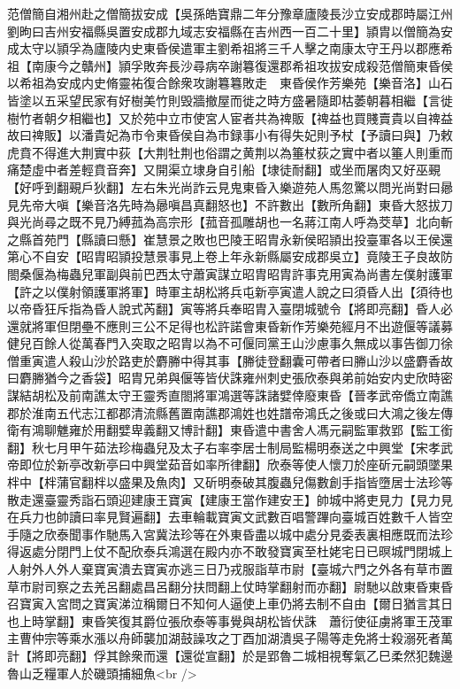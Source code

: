 范僧簡自湘州赴之僧簡拔安成【吳孫皓寶鼎二年分豫章廬陵長沙立安成郡時屬江州劉昫曰吉州安福縣吳置安成郡九域志安福縣在吉州西一百二十里】頴胄以僧簡為安成太守以頴孚為廬陵内史東昏侯遣軍主劉希祖將三千人擊之南康太守王丹以郡應希祖【南康今之贛州】頴孚敗奔長沙尋病卒謝篹復還郡希祖攻拔安成殺范僧簡東昏侯以希祖為安成内史脩靈祐復合餘衆攻謝篹篹敗走　東昏侯作芳樂苑【樂音洛】山石皆塗以五采望民家有好樹美竹則毁牆撤屋而徙之時方盛暑隨即枯萎朝暮相繼【言徙樹竹者朝夕相繼也】又於苑中立市使宮人宦者共為禆販【禆益也買賤賣貴以自禆益故曰禆販】以潘貴妃為市令東昏侯自為市録事小有得失妃則予杖【予讀曰與】乃敕虎賁不得進大荆實中荻【大荆牡荆也俗謂之黄荆以為箠杖荻之實中者以箠人則重而痛楚虛中者差輕賁音奔】又開渠立埭身自引船【埭徒耐翻】或坐而屠肉又好巫覡【好呼到翻覡戶狄翻】左右朱光尚詐云見鬼東昏入樂遊苑人馬忽驚以問光尚對曰曏見先帝大嗔【樂音洛先時為曏嗔昌真翻怒也】不許數出【數所角翻】東昏大怒拔刀與光尚尋之既不見乃縛菰為高宗形【菰音孤雕胡也一名蔣江南人呼為茭草】北向斬之縣首苑門【縣讀曰懸】崔慧景之敗也巴陵王昭胄永新侯昭頴出投臺軍各以王侯還第心不自安【昭胄昭頴投慧景事見上卷上年永新縣屬安成郡吳立】竟陵王子良故防閤桑偃為梅蟲兒軍副與前巴西太守蕭寅謀立昭胄昭胄許事克用寅為尚書左僕射護軍【許之以僕射領護軍將軍】時軍主胡松將兵屯新亭寅遣人說之曰須昏人出【須待也以帝昏狂斥指為昏人說式芮翻】寅等將兵奉昭胄入臺閉城號令【將即亮翻】昏人必還就將軍但閉壘不應則三公不足得也松許諾會東昏新作芳樂苑經月不出遊偃等議募健兒百餘人從萬春門入突取之昭胄以為不可偃同黨王山沙慮事久無成以事告御刀徐僧重寅遣人殺山沙於路吏於麝幐中得其事【幐徒登翻囊可帶者曰幐山沙以盛麝香故曰麝幐猶今之香袋】昭胄兄弟與偃等皆伏誅雍州刺史張欣泰與弟前始安内史欣時密謀結胡松及前南譙太守王靈秀直閤將軍鴻選等誅諸嬖倖廢東昏【晉孝武帝僑立南譙郡於淮南五代志江都郡清流縣舊置南譙郡鴻姓也姓譜帝鴻氏之後或曰大鴻之後左傳衛有鴻聊魋雍於用翻嬖卑義翻又博計翻】東昏遣中書舍人馮元嗣監軍救郢【監工銜翻】秋七月甲午茹法珍梅蟲兒及太子右率李居士制局監楊明泰送之中興堂【宋孝武帝即位於新亭改新亭曰中興堂茹音如率所律翻】欣泰等使人懷刀於座斫元嗣頭墜果柈中【柈蒲官翻柈以盛果及魚肉】又斫明泰破其腹蟲兒傷數創手指皆墮居士法珍等散走還臺靈秀詣石頭迎建康王寶寅【建康王當作建安王】帥城中將吏見力【見力見在兵力也帥讀曰率見賢遍翻】去車輪載寶寅文武數百唱警蹕向臺城百姓數千人皆空手隨之欣泰聞事作馳馬入宮冀法珍等在外東昏盡以城中處分見委表裏相應既而法珍得返處分閉門上仗不配欣泰兵鴻選在殿内亦不敢發寶寅至杜姥宅日已暝城門閉城上人射外人外人棄寶寅潰去寶寅亦逃三日乃戎服詣草市尉【臺城六門之外各有草市置草市尉司察之去羌呂翻處昌呂翻分扶問翻上仗時掌翻射而亦翻】尉馳以啟東昏東昏召寶寅入宮問之寶寅涕泣稱爾日不知何人逼使上車仍將去制不自由【爾日猶言其日也上時掌翻】東昏笑復其爵位張欣泰等事覺與胡松皆伏誅　蕭衍使征虜將軍王茂軍主曹仲宗等乘水漲以舟師襲加湖鼓譟攻之丁酉加湖潰吳子陽等走免將士殺溺死者萬計【將即亮翻】俘其餘衆而還【還從宣翻】於是郢魯二城相視奪氣乙巳柔然犯魏邊　魯山乏糧軍人於磯頭捕細魚<br />
